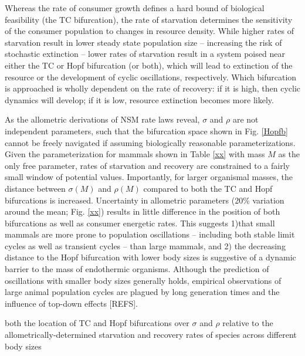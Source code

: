\documentclass[12pt,english]{article}
\begin{document}
\begin{spacing}{1.9}
Whereas the rate of consumer growth defines a hard bound of biological feasibility (the TC bifurcation), the rate of starvation determines the sensitivity of the consumer population to changes in resource density.
While higher rates of starvation result in lower steady state population size -- increasing the risk of stochastic extinction -- lower rates of starvation result in a system poised near either the TC or Hopf bifurcation (or both), which will lead to extinction of the resource or the development of cyclic oscillations, respectively.
Which bifurcation is approached is wholly dependent on the rate of recovery: if it is high, then cyclic dynamics will develop; if it is low, resource extinction becomes more likely.




As the allometric derivations of NSM rate laws reveal, $\sigma$ and $\rho$ are not independent parameters, such that the bifurcation space shown in Fig. \ref{Hopfb} cannot be freely navigated if assuming biologically reasonable parameterizations.
Given the parameterization for mammals shown in Table \ref{xx} with mass $M$ as the only free parameter, rates of starvation and recovery are constrained to a fairly small window of potential values.
Importantly, for larger organismal masses, the distance between $\sigma(M)$ and $\rho(M)$ compared to both the TC and Hopf bifurcations is increased.
Uncertainty in allometric parameters (20\% variation around the mean; Fig. \ref{xx}) results in little difference in the position of both bifurcations as well as consumer energetic rates.
This suggests 
1)that small mammals are more prone to population oscillations -- including both stable limit cycles as well as transient cycles -- than large mammals, and
2) the decreasing distance to the Hopf bifurcation with lower body sizes is suggestive of a dynamic barrier to the mass of endothermic organisms.
Although the prediction of oscillations with smaller body sizes  generally holds, empirical observations of large animal population cycles are plagued by long generation times and the influence of top-down effects [REFS].





both the location of TC and Hopf bifurcations over $\sigma$ and $\rho$ relative to the allometrically-determined starvation and recovery rates of species across different body sizes 


\end{spacing}
\end{document}
